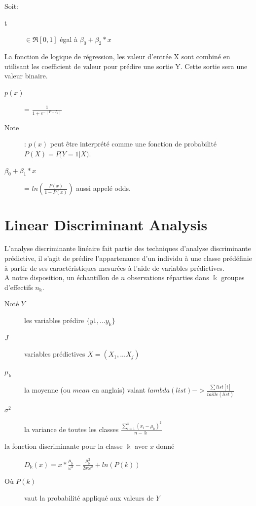 Soit:
\begin{description}
\item[t] $\in \Re[0,1]$ égal à $\beta_0 + \beta_2 * x$
\end{description}

La fonction de logique de régression, les valeur d'entrée X sont combiné en utilisant les coefficient de valeur pour prédire une sortie Y. Cette sortie sera une valeur binaire.

\begin{description}
\item[$p(x)$] = $ \frac{1}{1 + e^{-(P-I_n)}}$
\item[Note]: $p(x)$ peut être interprété comme une fonction de probabilité $P(X) = P[Y=1 | X)$.
\item[$\beta_0 + \beta_1 * x$] = $ ln(\frac{P(x)}{1 - P(x)})$ aussi appelé odds.
\end{description}

\section{Linear Discriminant Analysis}
L'analyse discriminante linéaire fait partie des techniques d'analyse discriminante prédictive, il s'agit de prédire l'appartenance d'un individu à une classe prédéfinie à partir de ses caractéristiques mesurées à l'aide de variables prédictives.\\
A notre disposition, un échantillon de $n$ observations réparties dans $\Bbbk$ groupes d'effectifs $n_{\Bbbk}$.\\
\begin{description}
\item[Noté $Y$] les variables prédire $\{y1, ... y_{\Bbbk}\}$
\item[$J$] variables prédictives $X = (X_1, ... X_j)$
\item[$\mu_{\Bbbk}$] la moyenne (ou $\textit{mean}$ en anglais) valant $lambda(list) -> \frac{\sum list[i]}{taille(list)}$
\item[$\sigma^2$] la variance de toutes les classes $\frac{\sum_{i=1}^n (x_i - \mu_{\Bbbk})^2}{n - \Bbbk}$
\item[la fonction discriminante pour la classe $\Bbbk$ avec $x$ donné] $D_{\Bbbk} (x) = x * \frac{\mu_{\Bbbk}}{\omega^2} - \frac{\mu_{\Bbbk}^2}{2x\omega^2} + ln(P(k))$
\item[Où $P(k)$] vaut la probabilité appliqué aux valeurs de $Y$
\end{description}

